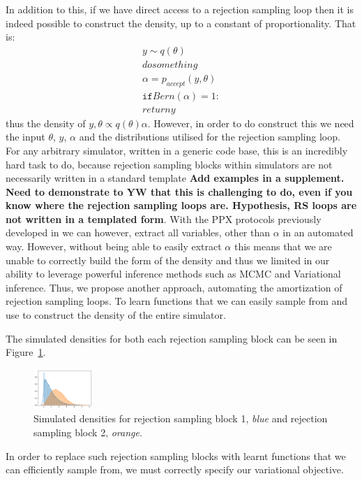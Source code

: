 \documentclass{article}
\begin{document}
In addition to this, if we have direct access to a rejection sampling loop then it is indeed 
possible to construct the density, up to a constant of proportionality. 
That is:
\begin{align*}
y \sim q(\theta) \\
do something \\
\alpha = p_{accept}(y,\theta) \\
\mathtt{if} Bern(\alpha) = 1: \\
return y
\end{align*}
thus the density of $y,\theta \propto q(\theta) \alpha$.
However, in order to do construct this we need the input $\theta$, $y$, $\alpha$ and the distributions utilised for the rejection sampling loop. 
For any arbitrary simulator, written in a generic code base, this is an incredibly hard 
task to do, because rejection sampling blocks within simulators are not necessarily written in a standard template
\textbf{Add examples in a supplement.  Need to demonstrate to YW that this is challenging to do, even if you know where 
the rejection sampling loops are. Hypothesis, RS loops are not written in a templated form}. With the PPX protocols previously developed in \cite{baydin2018efficient,gram2019hijacking} we can however, 
extract all variables, other than $\alpha$ in an automated way.
However, without being able to easily extract $\alpha$ this means that we are unable to 
correctly build the form of the density and thus we limited in our ability to leverage 
powerful inference methods such as MCMC and Variational inference.
Thus, we propose another approach, automating the amortization of rejection sampling loops. 
To learn functions that we can easily sample from and use to construct the density of the entire
simulator. 


The simulated densities for both each rejection sampling block can be seen in Figure~\ref{fig:rs_simulated}.
\begin{figure}
  \centering
  \includegraphics[width=0.2\textwidth, height=0.2\textheight, keepaspectratio]{rs_plots.png}
  \caption{ Simulated densities for rejection sampling block 1, \emph{blue} and rejection
  sampling block 2, \emph{orange}.}
  \label{fig:rs_simulated}
\end{figure}

In order to replace such rejection sampling blocks with learnt functions that we 
can efficiently sample from, we must correctly specify our variational objective.
\end{document}
